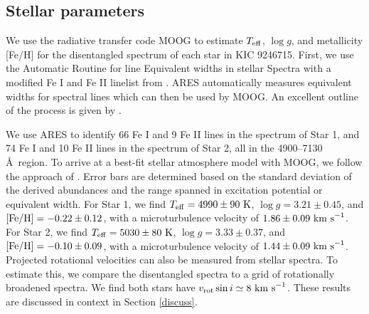 \subsection{Stellar parameters}\label{parameters}
We use the radiative transfer code MOOG \citep{sne73} to estimate $T_{\rm{eff}}$, $\log g$, and metallicity [Fe/H] for the disentangled spectrum of each star in KIC 9246715. First, we use the Automatic Routine for line Equivalent widths in stellar Spectra \citep[ARES,]{Sousa_2007} with a modified Fe I and Fe II linelist from \citet{tsa13}. ARES automatically measures equivalent widths for spectral lines which can then be used by MOOG. An excellent outline of the process is given by \citet{Sousa_2014}.

We use ARES to identify 66 Fe I and 9 Fe II lines in the spectrum of Star 1, and 74 Fe I and 10 Fe II lines in the spectrum of Star 2, all in the 4900--7130 \AA \ region. To arrive at a best-fit stellar atmosphere model with MOOG, we follow the approach of \citet{mag13}. Error bars are determined based on the standard deviation of the derived abundances and the range spanned in excitation potential or equivalent width. For Star 1, we find $T_{\rm{eff}} = 4990 \pm 90 \ \rm{K}$, $\log g = 3.21 \pm 0.45$, and $\rm{[Fe/H]} = -0.22 \pm 0.12$, with a microturbulence velocity of $1.86 \pm 0.09 \ \rm{km \ s}^{-1}$. For Star 2, we find $T_{\rm{eff}} = 5030 \pm 80 \ \rm{K}$, $\log g = 3.33 \pm 0.37$, and $\rm{[Fe/H]} = -0.10 \pm 0.09$, with a microturbulence velocity of $1.44 \pm 0.09 \ \rm{km \ s}^{-1}$. Projected rotational velocities can also be measured from stellar spectra. To estimate this, we compare the disentangled spectra to a grid of rotationally broadened spectra. We find both stars have $v_{\rm{rot}} \sin i \simeq 8 \ \rm{km \ s}^{-1}$. These results are discussed in context in Section \ref{discuss}.

  
  
  